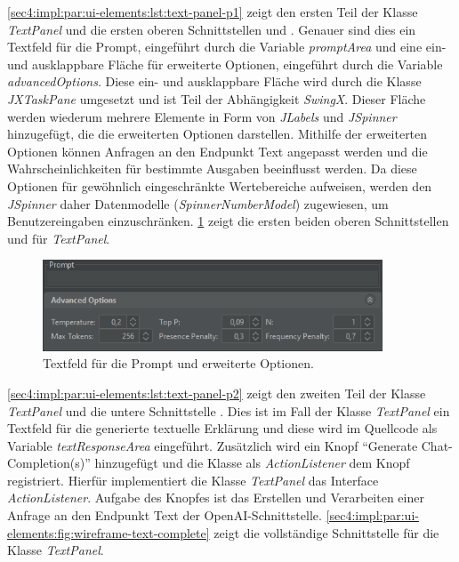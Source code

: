 

\cref{sec4:impl:par:ui-elements:lst:text-panel-p1} zeigt den ersten Teil der Klasse \textit{TextPanel} und die ersten oberen Schnittstellen  und .
Genauer sind dies ein Textfeld für die Prompt, eingeführt durch die Variable \textit{promptArea} und eine ein- und ausklappbare Fläche für erweiterte Optionen, eingeführt durch die Variable \textit{advancedOptions}.
Diese ein- und ausklappbare Fläche wird durch die Klasse \textit{JXTaskPane} umgesetzt und ist Teil der Abhängigkeit \textit{SwingX}. %
Dieser Fläche werden wiederum mehrere Elemente in Form von \textit{JLabels} und \textit{JSpinner} hinzugefügt, die die erweiterten Optionen darstellen.
Mithilfe der erweiterten Optionen können Anfragen an den Endpunkt Text angepasst werden und die Wahrscheinlichkeiten für bestimmte Ausgaben beeinflusst werden.
Da diese Optionen für gewöhnlich eingeschränkte Wertebereiche aufweisen, werden den \textit{JSpinner} daher Datenmodelle (\textit{SpinnerNumberModel}) zugewiesen, um Benutzereingaben einzuschränken.
\cref{sec4:impl:par:ui-elements:fig:wireframe-ui-8+9} zeigt die ersten beiden oberen Schnittstellen  und  für \textit{TextPanel}.

\begin{figure}[!ht]
  \includegraphics[width=0.9\textwidth]{chapter/chapter_4/wireframe-impl-ui-8+9}
  \caption{Textfeld für die Prompt und erweiterte Optionen.}
  \label{sec4:impl:par:ui-elements:fig:wireframe-ui-8+9}
\end{figure}



\cref{sec4:impl:par:ui-elements:lst:text-panel-p2} zeigt den zweiten Teil der Klasse \textit{TextPanel} und die untere Schnittstelle .
Dies ist im Fall der Klasse \textit{TextPanel} ein Textfeld für die generierte textuelle Erklärung und diese wird im Quellcode als Variable \textit{textResponseArea} eingeführt.
Zusätzlich wird ein Knopf \enquote{Generate Chat-Completion(s)} hinzugefügt und die Klasse als \textit{ActionListener} dem Knopf registriert.
Hierfür implementiert die Klasse \textit{TextPanel} das Interface \textit{ActionListener}.
Aufgabe des Knopfes ist das Erstellen und Verarbeiten einer Anfrage an den Endpunkt Text der OpenAI-Schnittstelle.
\cref{sec4:impl:par:ui-elements:fig:wireframe-text-complete} zeigt die vollständige Schnittstelle für die Klasse \textit{TextPanel}.

